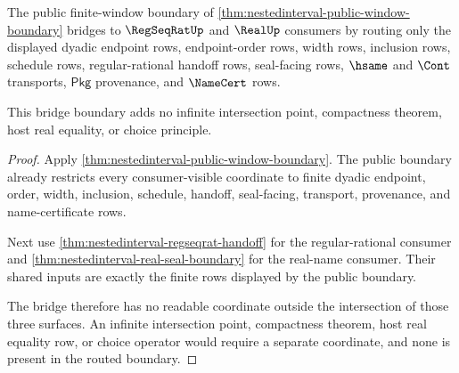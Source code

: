 \begin{theorem}
\label{thm:nestedinterval-consumer-bridge-boundary}
The public finite-window boundary of
\autoref{thm:nestedinterval-public-window-boundary} bridges to $\RegSeqRatUp$
and $\RealUp$ consumers by routing only the displayed dyadic endpoint rows,
endpoint-order rows, width rows, inclusion rows, schedule rows,
regular-rational handoff rows, seal-facing rows, $\hsame$ and $\Cont$
transports, $\mathsf{Pkg}$ provenance, and $\NameCert$ rows.

This bridge boundary adds no infinite intersection point, compactness theorem,
host real equality, or choice principle.
\end{theorem}
\begin{proof}
Apply \autoref{thm:nestedinterval-public-window-boundary}. The public boundary
already restricts every consumer-visible coordinate to finite dyadic endpoint,
order, width, inclusion, schedule, handoff, seal-facing, transport,
provenance, and name-certificate rows.

Next use \autoref{thm:nestedinterval-regseqrat-handoff} for the
regular-rational consumer and \autoref{thm:nestedinterval-real-seal-boundary}
for the real-name consumer. Their shared inputs are exactly the finite rows
displayed by the public boundary.

The bridge therefore has no readable coordinate outside the intersection of
those three surfaces. An infinite intersection point, compactness theorem, host
real equality row, or choice operator would require a separate coordinate, and
none is present in the routed boundary.
\end{proof}

